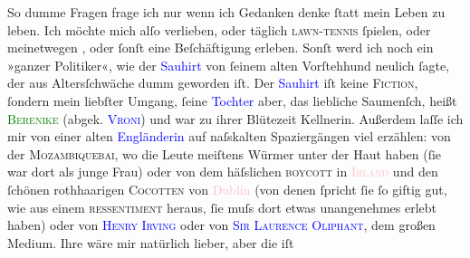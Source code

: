            \pstart
           So dumme Fragen frage ich nur wenn ich Gedanken denke ſtatt mein Leben zu leben. Ich
               möchte mich alſo verlieben, oder täglich \textsc{lawn-tennis}{ }ſpielen, oder meinetwegen \label{K_L00023_6v}\label{K_L00023_6h}, oder
               ſonſt eine Beſchäftigung erleben.\pend
           \pstart
           Sonſt werd ich noch ein »ganzer Politiker«, wie der \textcolor{blue}{Sauhirt}{} von ſeinem alten Vorſtehhund neulich ſagte, der aus
               Altersſchwäche dumm geworden iſt. Der \textcolor{blue}{Sauhirt}{} iſt keine \textsc{Fiction},
               ſondern mein liebſter Umgang, ſeine \textcolor{blue}{Tochter}{} aber, das liebliche Saumenſch, heißt \textcolor{green}{\textsc{Berenike}}{} (abgek. \textcolor{blue}{\textsc{Vroni}}{}\ledrightnote{\textcolor{blue}{Veronica no name provided}}) und war zu ihrer Blütezeit Kellnerin. Außerdem laſſe ich mir von einer alten
                  \textcolor{blue}{Engländerin}{} auf naſskalten
               Spaziergängen viel erzählen: von der \textsc{Mozambiquebai}, wo die Leute meiſtens Würmer unter der Haut haben (ſie war dort als
               junge Frau) oder von dem häſslichen \textsc{boycott} in \textcolor{pink}{\textsc{Irland}}{}\ledrightnote{\textcolor{pink}{Irland}} und den ſchönen rothhaarigen \textsc{Cocotten} von \textcolor{pink}{Dublin}{}\ledrightnote{\textcolor{pink}{Dublin}} (von denen ſpricht ſie ſo giftig gut, wie aus
               einem \textsc{ressentiment} heraus, ſie muſs dort etwas unangenehmes
               erlebt haben) oder von \textcolor{blue}{\textsc{Henry Irving}}{}\ledrightnote{\textcolor{blue}{Henry Irving}} oder von \textcolor{blue}{\textsc{Sir Laurence Oliphant}}{}\ledrightnote{\textcolor{blue}{Laurence Oliphant}}, dem großen Medium.\pend
           \pstart
           {\pb}Ihre \label{K_L00023_7v}\label{K_L00023_7h} wäre mir natürlich lieber, aber die iſt
